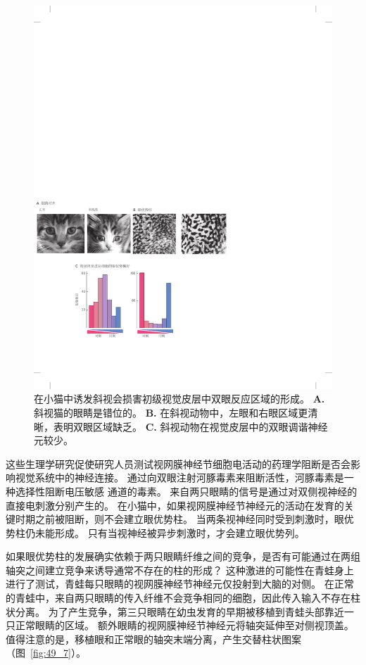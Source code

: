 \begin{figure}[htbp]
	\centering
	\includegraphics[width=0.8\linewidth]{chap49/fig_49_6}
	\caption{在小猫中诱发斜视会损害初级视觉皮层中双眼反应区域的形成。
		\textbf{A.} 斜视猫的眼睛是错位的。
		\textbf{B.} 在斜视动物中，左眼和右眼区域更清晰，表明双眼区域缺乏。
		\textbf{C.} 斜视动物在视觉皮层中的双眼调谐神经元较少。}
	\label{fig:49_6}
\end{figure}


这些生理学研究促使研究人员测试视网膜神经节细胞电活动的药理学阻断是否会影响视觉系统中的神经连接。
通过向双眼注射河豚毒素来阻断活性，河豚毒素是一种选择性阻断电压敏感  通道的毒素。
来自两只眼睛的信号是通过对双侧视神经的直接电刺激分别产生的。
在小猫中，如果视网膜神经节神经元的活动在发育的关键时期之前被阻断，则不会建立眼优势柱。
当两条视神经同时受到刺激时，眼优势柱仍未能形成。
只有当视神经被异步刺激时，才会建立眼优势列。


如果眼优势柱的发展确实依赖于两只眼睛纤维之间的竞争，是否有可能通过在两组轴突之间建立竞争来诱导通常不存在的柱的形成？
这种激进的可能性在青蛙身上进行了测试，青蛙每只眼睛的视网膜神经节神经元仅投射到大脑的对侧。
在正常的青蛙中，来自两只眼睛的传入纤维不会竞争相同的细胞，因此传入输入不存在柱状分离。
为了产生竞争，第三只眼睛在幼虫发育的早期被移植到青蛙头部靠近一只正常眼睛的区域。
额外眼睛的视网膜神经节神经元将轴突延伸至对侧视顶盖。
值得注意的是，移植眼和正常眼的轴突末端分离，产生交替柱状图案（图~\ref{fig:49_7}）。


